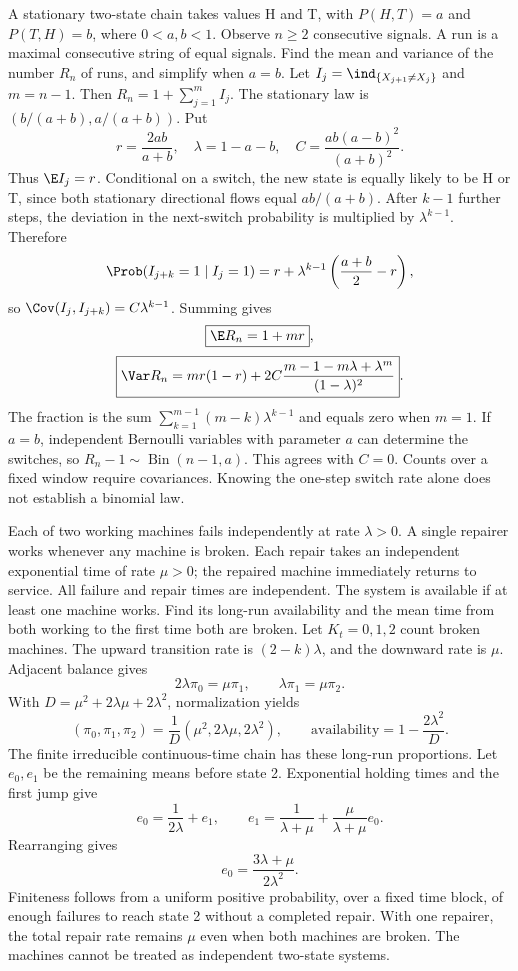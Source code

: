 A stationary two-state chain takes values H and T, with $P(H,T)=a$ and $P(T,H)=b$, where $0<a,b<1$. Observe $n\ge2$ consecutive signals. A run is a maximal consecutive string of equal signals. Find the mean and variance of the number $R_n$ of runs, and simplify when $a=b$.
\solution Let $I_j=\ind_{\{X_{j+1}\ne X_j\}}$ and $m=n-1$. Then $R_n=1+\sum_{j=1}^m I_j$. The stationary law is $(b/(a+b),a/(a+b))$. Put
\[
 r=\frac{2ab}{a+b},\quad \lambda=1-a-b,\quad
 C=\frac{ab(a-b)^2}{(a+b)^2}.
\]
Thus $\E I_j=r$. Conditional on a switch, the new state is equally likely to be H or T, since both stationary directional flows equal $ab/(a+b)$. After $k-1$ further steps, the deviation in the next-switch probability is multiplied by $\lambda^{k-1}$. Therefore
\[
 \Prob(I_{j+k}=1\mid I_j=1)
 =r+\lambda^{k-1}\left(\frac{a+b}{2}-r\right),
\]
so $\Cov(I_j,I_{j+k})=C\lambda^{k-1}$. Summing gives
\[
 \boxed{\E R_n=1+mr},
\]
\[
 \boxed{\Var R_n=mr(1-r)
 +2C\frac{m-1-m\lambda+\lambda^m}{(1-\lambda)^2}}.
\]
The fraction is the sum $\sum_{k=1}^{m-1}(m-k)\lambda^{k-1}$ and equals zero when $m=1$. If $a=b$, independent Bernoulli variables with parameter $a$ can determine the switches, so $R_n-1\sim\operatorname{Bin}(n-1,a)$. This agrees with $C=0$.
\insight Counts over a fixed window require covariances. Knowing the one-step switch rate alone does not establish a binomial law.



Each of two working machines fails independently at rate $\lambda>0$. A single repairer works whenever any machine is broken. Each repair takes an independent exponential time of rate $\mu>0$; the repaired machine immediately returns to service. All failure and repair times are independent. The system is available if at least one machine works. Find its long-run availability and the mean time from both working to the first time both are broken.
\solution Let $K_t=0,1,2$ count broken machines. The upward transition rate is $(2-k)\lambda$, and the downward rate is $\mu$. Adjacent balance gives
\[
 2\lambda\pi_0=\mu\pi_1,\qquad
 \lambda\pi_1=\mu\pi_2.
\]
With $D=\mu^2+2\lambda\mu+2\lambda^2$, normalization yields
\[
 (\pi_0,\pi_1,\pi_2)=\frac1D(\mu^2,2\lambda\mu,2\lambda^2),
 \qquad \boxed{\text{availability}=1-\frac{2\lambda^2}{D}}.
\]
The finite irreducible continuous-time chain has these long-run proportions. Let $e_0,e_1$ be the remaining means before state 2. Exponential holding times and the first jump give
\[
 e_0=\frac1{2\lambda}+e_1,\qquad
 e_1=\frac1{\lambda+\mu}+\frac\mu{\lambda+\mu}e_0.
\]
Rearranging gives
\[
 \boxed{e_0=\frac{3\lambda+\mu}{2\lambda^2}}.
\]
Finiteness follows from a uniform positive probability, over a fixed time block, of enough failures to reach state 2 without a completed repair.
\insight With one repairer, the total repair rate remains $\mu$ even when both machines are broken. The machines cannot be treated as independent two-state systems.

